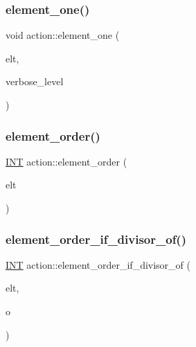 \mbox{\label{classaction_a780a105daf04d6d1fe7e2f63b3c88e3b}} 
\subsubsection{\texorpdfstring{element\+\_\+one()}{element\_one()}}
{\footnotesize\ttfamily void action\+::element\+\_\+one (\begin{DoxyParamCaption}\item[{void $\ast$}]{elt,  }\item[{\mbox{\hyperlink{galois_8h_a09fddde158a3a20bd2dcadb609de11dc}{I\+NT}}}]{verbose\+\_\+level }\end{DoxyParamCaption})}

\mbox{\label{classaction_a50046bf5383ee5febe5a882677626d34}} 
\subsubsection{\texorpdfstring{element\+\_\+order()}{element\_order()}}
{\footnotesize\ttfamily \mbox{\hyperlink{galois_8h_a09fddde158a3a20bd2dcadb609de11dc}{I\+NT}} action\+::element\+\_\+order (\begin{DoxyParamCaption}\item[{void $\ast$}]{elt }\end{DoxyParamCaption})}

\mbox{\label{classaction_af8ef092c60060fa6201845ee86cbc9c5}} 
\subsubsection{\texorpdfstring{element\+\_\+order\+\_\+if\+\_\+divisor\+\_\+of()}{element\_order\_if\_divisor\_of()}}
{\footnotesize\ttfamily \mbox{\hyperlink{galois_8h_a09fddde158a3a20bd2dcadb609de11dc}{I\+NT}} action\+::element\+\_\+order\+\_\+if\+\_\+divisor\+\_\+of (\begin{DoxyParamCaption}\item[{void $\ast$}]{elt,  }\item[{\mbox{\hyperlink{galois_8h_a09fddde158a3a20bd2dcadb609de11dc}{I\+NT}}}]{o }\end{DoxyParamCaption})}

